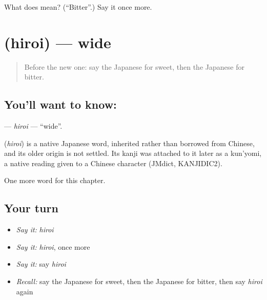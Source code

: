 \begin{tcolorbox}[breakable,colback=teal!4,colframe=teal!35!black,title={Before you move on}]
What does  mean? (\textquotedblleft{}Bitter\textquotedblright{}.) Say it once more.
\end{tcolorbox}
\section[\texorpdfstring{\ja{ひろい} (hiroi)}{ひろい (hiroi)}]{ (hiroi) — wide}

\label{lesson:JA-C50-hiroi}



\begin{quote}
Before the new one: say the Japanese for sweet, then the Japanese for bitter.
\end{quote}

\subsection*{You'll want to know: }
\textbf{} — \emph{hiroi} — \textquotedblleft{}wide\textquotedblright{}.

\begin{cousinweb}
\textbf{} (\emph{hiroi}) is a native Japanese word, inherited rather than borrowed from Chinese, and its older origin is not settled. Its kanji was attached to it later as a kun'yomi, a native reading given to a Chinese character (JMdict, KANJIDIC2).
\end{cousinweb}

\begin{grammarlens}[title={What you've built}]
One more word for this chapter.
\end{grammarlens}

\subsection*{Your turn}
\begin{itemize}
\raggedright
  \item \emph{Say it:} \emph{hiroi}
  \item \emph{Say it:} \emph{hiroi}, once more
  \item \emph{Say it:} say \emph{hiroi}
  \item \emph{Recall:} say the Japanese for sweet, then the Japanese for bitter, then say \emph{hiroi} again
\end{itemize}

